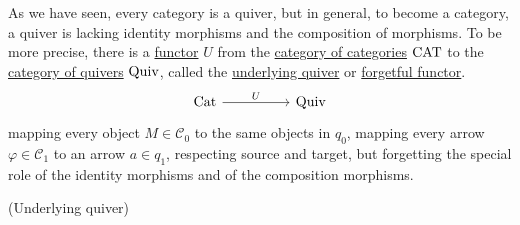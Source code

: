 \noindent As we have seen, every category is a quiver, but in general, to become a category, a quiver is lacking identity morphisms
and the composition of morphisms. To be more precise, there is a \ul{functor} $U$ from the \ul{category of categories} $\textup{CAT}$ to the
\ul{category of quivers} $\textup{Quiv}$, called the \ul{underlying quiver} or \ul{forgetful functor}.
\[
\begin{tikzcd}
\textup{Cat} \arrow[rr,"U"] &  & \textup{Quiv}
\end{tikzcd}
\]
mapping every object $M \in \mathcal{C}_{0}$ to the same objects in $q_{0}$, mapping every arrow $\varphi \in \mathcal{C}_{1}$ to 
an arrow $a \in q_{1}$, respecting source and target, but forgetting the special role of the identity morphisms and of the composition morphisms.

\newpage
\begin{example}{(Underlying quiver)}\\


\end{example}
